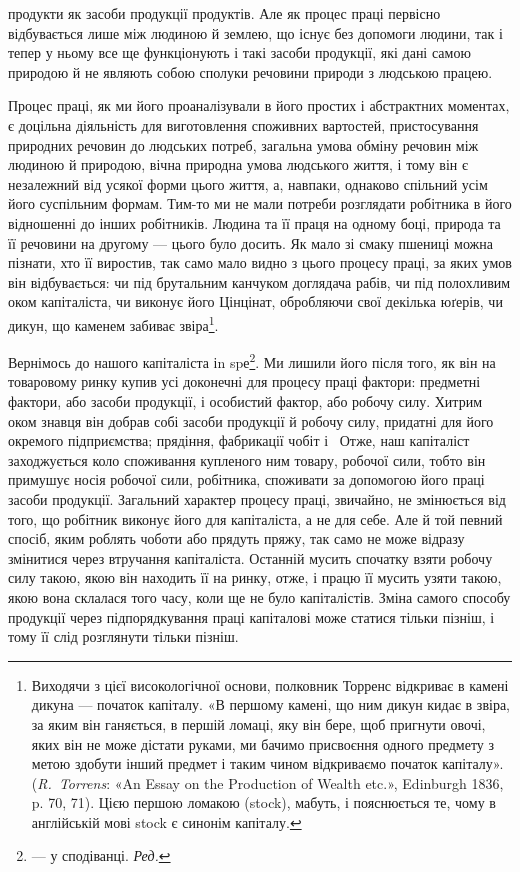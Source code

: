 \parcont{}  %
продукти як засоби продукції продуктів. Але як процес праці
первісно відбувається лише між людиною й землею, що існує
без допомоги людини, так і тепер у ньому все ще функціонують
і такі засоби продукції, які дані самою природою й не являють
собою сполуки речовини природи з людською працею.

Процес праці, як ми його проаналізували в його простих і абстрактних
моментах, є доцільна діяльність для виготовлення
споживних вартостей, пристосування природних речовин до
людських потреб, загальна умова обміну речовин між людиною
й природою, вічна природна умова людського життя, і тому він
є незалежний від усякої форми цього життя, а, навпаки, однаково
спільний усім його суспільним формам. Тим-то ми не мали
потреби розглядати робітника в його відношенні до інших робітників.
Людина та її праця на одному боці, природа та її речовини
на другому — цього було досить. Як мало зі смаку пшениці
можна пізнати, хто її виростив, так само мало видно з цього процесу
праці, за яких умов він відбувається: чи під брутальним
канчуком доглядача рабів, чи під полохливим оком капіталіста,
чи виконує його Цінцінат, обробляючи свої декілька юґерів,
чи дикун, що каменем забиває звіра\footnote{
Виходячи з цієї високологічної основи, полковник Торренс відкриває
в камені дикуна — початок капіталу. «В першому камені, що ним
дикун кидає в звіра, за яким він ганяється, в першій ломаці, яку він бере,
щоб пригнути овочі, яких він не може дістати руками, ми бачимо присвоєння
одного предмету з метою здобути інший предмет і таким чином
відкриваємо початок капіталу». (\emph{R.~Torrens}: «An Essay on the
Production of Wealth etc.», Edinburgh 1836, p. 70, 71). Цією першою
ломакою (stock), мабуть, і пояснюється те, чому в англійській мові stock
є синонім капіталу.
}.

Вернімось до нашого капіталіста іn spе\footnote*{
— у сподіванці. \emph{Ред.}
}. Ми лишили його
після того, як він на товаровому ринку купив усі доконечні
для процесу праці фактори: предметні фактори, або засоби продукції,
і особистий фактор, або робочу силу. Хитрим оком знавця
він добрав собі засоби продукції й робочу силу, придатні для
його окремого підприємства; прядіння, фабрикації чобіт і~
Отже, наш капіталіст заходжується коло споживання купленого
ним товару, робочої сили, тобто він примушує носія робочої сили,
робітника, споживати за допомогою його праці засоби продукції.
Загальний характер процесу праці, звичайно, не змінюється від
того, що робітник виконує його для капіталіста, а не для себе.
Але й той певний спосіб, яким роблять чоботи або прядуть пряжу,
так само не може відразу змінитися через втручання капіталіста.
Останній мусить спочатку взяти робочу силу такою, якою він
находить її на ринку, отже, і працю її мусить узяти такою, якою
вона склалася того часу, коли ще не було капіталістів. Зміна
самого способу продукції через підпорядкування праці капіталові
може статися тільки пізніш, і тому її слід розглянути
тільки пізніш.
